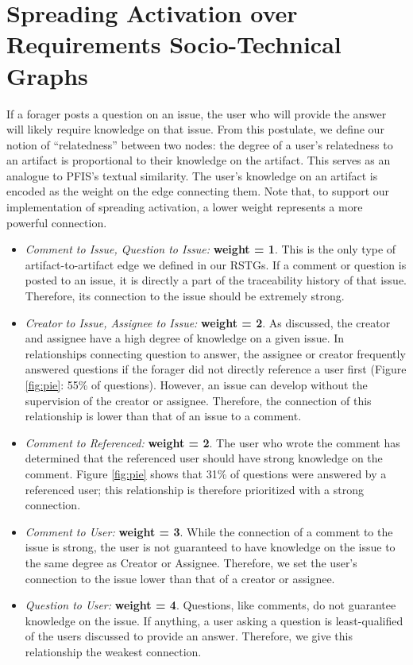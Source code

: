 \section{Spreading Activation over Requirements Socio-Technical Graphs}
If a forager posts a question on an issue, the user who will provide the answer will likely require knowledge on that issue. From this postulate, we define our notion of ``relatedness'' between two nodes: the degree of a user's relatedness to an artifact is proportional to their knowledge on the artifact. This serves as an analogue to PFIS's textual similarity. The user's knowledge on an artifact is encoded as the weight on the edge connecting them. Note that, to support our implementation of spreading activation, a lower weight represents a more powerful connection.
\begin{itemize}
  \item \textit{Comment to Issue, Question to Issue:} \textbf{weight = 1}. This is the only type of artifact-to-artifact edge we defined in our RSTGs. If a comment or question is posted to an issue, it is directly a part of the traceability history of that issue. Therefore, its connection to the issue should be extremely strong.
  \item \textit{Creator to Issue, Assignee to Issue:} \textbf{weight = 2}. As discussed, the creator and assignee have a high degree of knowledge on a given issue. In relationships connecting question to answer, the assignee or creator frequently answered questions if the forager did not directly reference a user first (Figure \ref{fig:pie}: 55\% of questions). However, an issue can develop without the supervision of the creator or assignee. Therefore, the connection of this relationship is lower than that of an issue to a comment.
  \item \textit{Comment to Referenced:}  \textbf{weight = 2}. The user who wrote the comment has determined that the referenced user should have strong knowledge on the comment. Figure \ref{fig:pie} shows that 31\% of questions were answered by a referenced user; this relationship is therefore prioritized with a strong connection.
  \item \textit{Comment to User:} \textbf{weight = 3}. While the connection of a comment to the issue is strong, the user is not guaranteed to have knowledge on the issue to the same degree as Creator or Assignee. Therefore, we set the user's connection to the issue lower than that of a creator or assignee.
  \item \textit{Question to User:} \textbf{weight = 4}. Questions, like comments, do not guarantee knowledge on the issue. If anything, a user asking a question is least-qualified of the users discussed to provide an answer. Therefore, we give this relationship the weakest connection.
\end{itemize}

